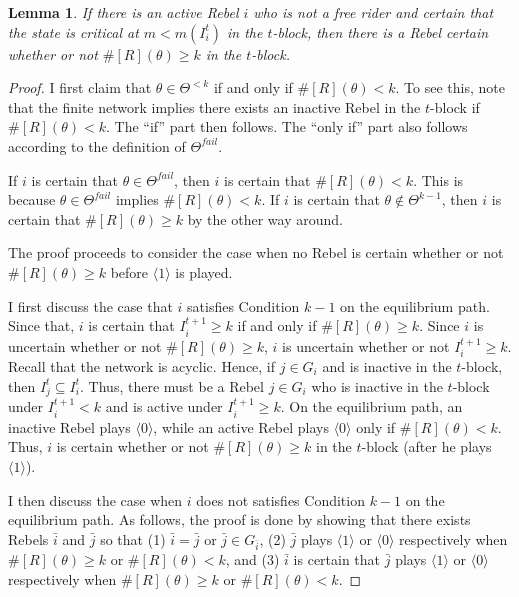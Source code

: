 \documentclass[12pt,letter]{article}
\newtheorem{lemma}{Lemma}[section]
\theoremstyle{definition}
\theoremstyle{remark}
\theoremstyle{claim}
\begin{document}
\begin{lemma} If there is an active Rebel $i$ who is not a free rider and certain that the state is critical at $m<m(I^t_i)$ in the $t$-block, then there is a Rebel certain whether or not $\#[R](\theta)\geq k$ in the $t$-block.

\end{lemma}
\begin{proof}
I first claim that $\theta\in \Theta^{<k}$ if and only if $\#[R](\theta)<k$. To see this, note that the finite network implies there exists an inactive Rebel in the $t$-block if $\#[R](\theta)<k$. The ``if'' part then follows. The ``only if'' part also follows according to the definition of $\Theta^{fail}$.

If $i$ is certain that $\theta\in \Theta^{fail}$, then $i$ is certain that $\#[R](\theta)<k$. This is because $\theta\in \Theta^{fail}$ implies $\#[R](\theta)<k$. If $i$ is certain that $\theta\notin \Theta^{k-1}$, then $i$ is certain that $\#[R](\theta)\geq k$ by the other way around.

The proof proceeds to consider the case when no Rebel is certain whether or not $\#[R](\theta)\geq k$ before $\langle 1 \rangle$ is played. 

I first discuss the case that $i$ satisfies Condition $k-1$ on the equilibrium path. Since that, $i$ is certain that $I^{t+1}_i\geq k$ if and only if $\#[R](\theta)\geq k$. Since $i$ is uncertain whether or not $\#[R](\theta)\geq k$, $i$ is uncertain whether or not $I^{t+1}_i\geq k$. Recall that the network is acyclic. Hence, if $j\in G_i$ and is inactive in the $t$-block, then $I^t_j\subseteq I^t_i$. Thus, there must be a Rebel $j\in G_i$ who is inactive in the $t$-block under $I^{t+1}_i<k$ and is active under $I^{t+1}_i\geq k$. On the equilibrium path, an inactive Rebel plays $\langle 0 \rangle$, while an active Rebel plays $\langle 0 \rangle$ only if $\#[R](\theta)<k$. Thus, $i$ is certain whether or not $\#[R](\theta)\geq k$ in the $t$-block (after he plays $\langle 1 \rangle$).     

I then discuss the case when $i$ does not satisfies Condition $k-1$ on the equilibrium path. As follows, the proof is done by showing that there exists Rebels $\bar{i}$ and $\bar{j}$ so that (1) $\bar{i}=\bar{j}$ or $\bar{j}\in G_{\bar{i}}$, (2) $\bar{j}$ plays $\langle 1 \rangle$ or $\langle 0 \rangle$ respectively when $\#[R](\theta)\geq k$ or $\#[R](\theta)<k$, and (3) $\bar{i}$ is certain that $\bar{j}$ plays $\langle 1 \rangle$ or $\langle 0 \rangle$ respectively when $\#[R](\theta)\geq k$ or $\#[R](\theta)<k$. 


\end{proof}
\end{document}
